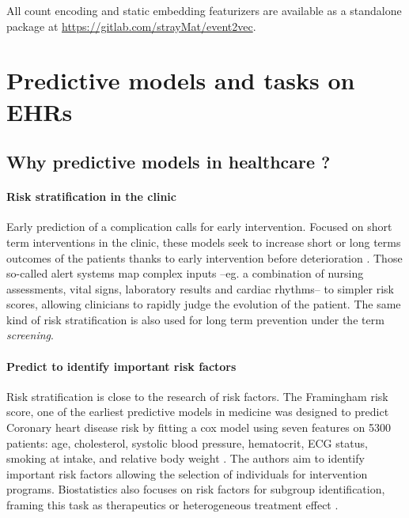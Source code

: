 \documentclass[french,12pt,twoside,a4paper]{book}
\begin{document}
\begin{appendices}
  All count encoding and static embedding featurizers are available as a standalone
  package at \url{https://gitlab.com/strayMat/event2vec}.


  \section{Predictive models and tasks on EHRs}\label{apd:review_predictions}

  \subsection{Why predictive models in healthcare ?}\label{apd:review_predictive_tasks}%


  \paragraph{Risk stratification in the clinic}

  Early prediction of a complication calls for early intervention. Focused on short
  term interventions in the clinic, these models seek to increase short or long
  terms outcomes of the patients thanks to early intervention before deterioration
  \citep{tang2007global, rothman2013development, wong2021external}. Those so-called alert systems
  \citep{yu2018artificial} map complex inputs --eg. a combination of nursing
  assessments, vital signs, laboratory results and cardiac rhythms-- to simpler
  risk scores, allowing clinicians to rapidly judge the evolution of the patient.
  The same kind of risk stratification is also used for long term prevention under
  the term \emph{screening}.

  \paragraph{Predict to identify important risk factors}

  Risk stratification is close to the research of risk factors.
  The Framingham risk score, one of the earliest predictive models in medicine was
  designed to predict Coronary heart disease risk by fitting a cox model using
  seven features on 5300 patients: age, cholesterol, systolic blood pressure,
  hematocrit, ECG status, smoking at intake, and relative body weight
  \citep{brand1976multivariate}. The authors aim to identify important risk factors
  allowing the selection of individuals for intervention programs.
  Biostatistics also focuses on risk factors for subgroup identification, framing
  this task as therapeutics \citep{steyerberg2009applications} or heterogeneous
  treatment effect \citep{harrell2001regression}.


\end{appendices}
\end{document}
